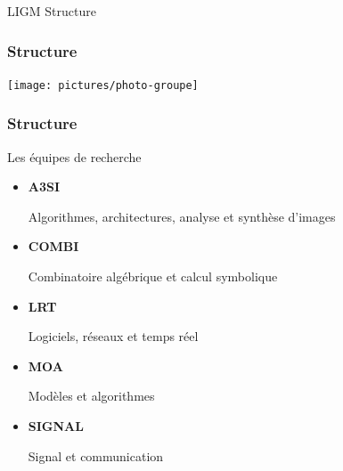 \documentclass[]{beamer}
\begin{document}
\begin{frame}[label=introduction, standout]{LIGM}
  Structure
\end{frame}


\begin{frame}
  \frametitle{Structure}

  \begin{center}
    \texttt{[image: pictures/photo-groupe]}
  \end{center}

\end{frame}


\begin{frame}
  \frametitle{Structure}

  \begin{block}{Les équipes de recherche}
    \begin{itemize}
      \item \textbf{A3SI}

      Algorithmes, architectures, analyse et synthèse d’images

      \item \textbf{COMBI}

      Combinatoire algébrique et calcul symbolique

      \item \textbf{LRT}

      Logiciels, réseaux et temps réel

      \item \textbf{MOA}

      Modèles et algorithmes

      \item \textbf{SIGNAL}

      Signal et communication
    \end{itemize}
  \end{block}

\end{frame}

\end{document}

